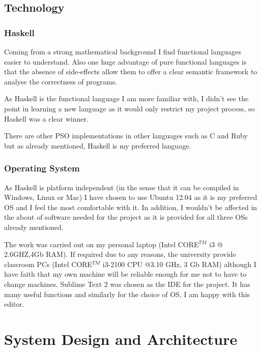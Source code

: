 \documentclass{pdfmx4020}
\begin{document}

  \section{Technology} %
  \label{sec:technology}

    \subsection{Haskell} %
    \label{sub:haskell}
      Coming from a strong mathematical background I find functional languages easier to understand. Also one huge advantage of pure functional languages is that the absence of side-effects allow them to offer a clear semantic framework to analyse the correctness of programs. 

      As Haskell is the functional language I am more familiar with, I didn't see the point in learning a new language as it would only restrict my project process, so Haskell was a clear winner. 

      There are other PSO implementations in other languages such as C and Ruby but as already mentioned, Haskell is my preferred language. 

    \subsection{Operating System} %
    \label{sub:operating_system}
      As Haskell is platform independent (in the sense that it can be compiled in Windows, Linux or Mac) I have chosen to use Ubuntu 12.04 as it is my preferred OS and I feel the most comfortable with it. In addition, I wouldn't be affected in the about of software needed for the project as it is provided for all three OSs already mentioned. 

      The work was carried out on my personal laptop (Intel CORE$^{TM}$ i3 @ 2.6GHZ,4Gb RAM). If required due to any reasons, the university provide classroom PCs (Intel CORE$^{TM}$ i3-2100 CPU @3.10 GHz, 3 Gb RAM) although I have faith that my own machine will be reliable enough for me not to have to change machines. 
      Sublime Text 2 was chosen as the IDE for the project. It has many useful functions \cite{sublime} and similarly for the choice of OS, I am happy with this editor.
  

\chapter{System Design and Architecture}
\end{document}
